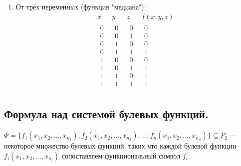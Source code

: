 \begin{enumerate}
	\item
	От трёх переменных (функция "медиана"):
	$$
	\begin{array}{rrr|c}
		x~~ & y~~ & z~~ & f(x,y,z)\\
		\hline
		\begin{array}{r} %
			0\\ 0\\ 0\\ 0\\ 1\\ 1\\ 1\\ 1\\
		\end{array}
		&
		\begin{array}{r}
			0\\ 0\\ 1\\ 1\\ 0\\ 0\\ 1\\ 1\\
		\end{array}
		&
		\begin{array}{r}
			0\\ 1\\ 0\\ 1\\ 0\\ 1\\ 0\\ 1\\
		\end{array}
		&
		\begin{array}{r}
			0\\ 0\\ 0\\ 1\\ 0\\ 1\\ 1\\ 1\\
		\end{array}
	\end{array}
	$$
\end{enumerate}	


\subsection{Формула над системой булевых функций.}
$
	\Phi =
	\{
		f_{1}(x_{1}, x_{2}, \ldots, x_{n_1});
		f_{2}(x_{1}, x_{2}, \ldots, x_{n_2});
		\ldots;
		f_{n}(x_{1}, x_{2}, \ldots, x_{n_n})
	\} \subseteq P_2
$ --- некоторое множество булевых функций,
	таких что каждой булевой функции $f_{i}(x_{1}, x_{2}, \ldots, x_{n_i})$
	сопоставляем функциональный символ $f_{i}$.


